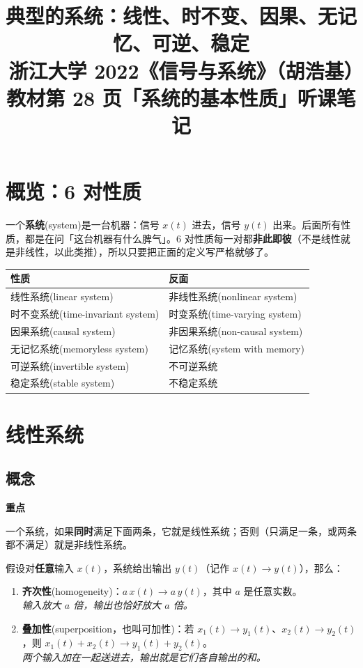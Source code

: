 \documentclass[UTF8,a4paper,11pt]{ctexart}
\title{典型的系统：线性、时不变、因果、无记忆、可逆、稳定\\\large 浙江大学 2022《信号与系统》（胡浩基）教材第 28 页「系统的基本性质」听课笔记}
\author{}
\date{}
\newenvironment{remember}{\begin{rememberbox}\textbf{重点}\par\smallskip}{\end{rememberbox}}
\newcounter{ex}[section]
\begin{document}
\pagestyle{plain}
\maketitle

\section{概览：6 对性质}
一个\textbf{系统}(system)是一台机器：信号 $x(t)$ 进去，信号 $y(t)$ 出来。后面所有性质，都是在问「这台机器有什么脾气」。6 对性质每一对都\textbf{非此即彼}（不是线性就是非线性，以此类推），所以只要把正面的定义写严格就够了。

\begin{center}
\begin{tabular}{@{}ll@{}}
\toprule
性质 & 反面\\
\midrule
线性系统(linear system) & 非线性系统(nonlinear system)\\
时不变系统(time-invariant system) & 时变系统(time-varying system)\\
因果系统(causal system) & 非因果系统(non-causal system)\\
无记忆系统(memoryless system) & 记忆系统(system with memory)\\
可逆系统(invertible system) & 不可逆系统\\
稳定系统(stable system) & 不稳定系统\\
\bottomrule
\end{tabular}
\end{center}

\section{线性系统}
\subsection{概念}
\begin{remember}
一个系统，如果\textbf{同时}满足下面两条，它就是线性系统；否则（只满足一条，或两条都不满足）就是非线性系统。

\medskip
假设对\textbf{任意}输入 $x(t)$，系统给出输出 $y(t)$（记作 $x(t)\to y(t)$），那么：
\begin{enumerate}[nosep]
\item \textbf{齐次性}(homogeneity)：$a\,x(t)\to a\,y(t)$，其中 $a$ 是任意实数。\\
\hfill\emph{输入放大 $a$ 倍，输出也恰好放大 $a$ 倍。}
\item \textbf{叠加性}(superposition，也叫可加性)：若 $x_1(t)\to y_1(t)$、$x_2(t)\to y_2(t)$，则 $x_1(t)+x_2(t)\to y_1(t)+y_2(t)$。\\
\hfill\emph{两个输入加在一起送进去，输出就是它们各自输出的和。}
\end{enumerate}
\end{remember}
\end{document}
